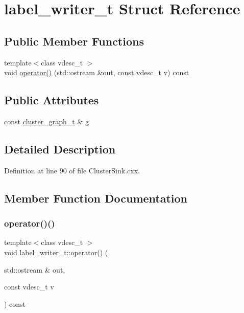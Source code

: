 \hypertarget{structlabel__writer__t}{}\section{label\+\_\+writer\+\_\+t Struct Reference}
\label{structlabel__writer__t}
\subsection*{Public Member Functions}
\begin{DoxyCompactItemize}
\item 
{\footnotesize template$<$class vdesc\+\_\+t $>$ }\\void \hyperlink{structlabel__writer__t_a79b36a668d266dccd58e0fccb69c147f}{operator()} (std\+::ostream \&out, const vdesc\+\_\+t v) const
\end{DoxyCompactItemize}
\subsection*{Public Attributes}
\begin{DoxyCompactItemize}
\item 
const \hyperlink{namespace_wire_cell_a6a9ecba14dfba50cdb081820a8bcacbe}{cluster\+\_\+graph\+\_\+t} \& \hyperlink{structlabel__writer__t_af3ff7cf87d5cdd0e60c0e1b47bc6717a}{g}
\end{DoxyCompactItemize}


\subsection{Detailed Description}


Definition at line 90 of file Cluster\+Sink.\+cxx.



\subsection{Member Function Documentation}
\mbox{\label{structlabel__writer__t_a79b36a668d266dccd58e0fccb69c147f}} 
\subsubsection{\texorpdfstring{operator()()}{operator()()}}
{\footnotesize\ttfamily template$<$class vdesc\+\_\+t $>$ \\
void label\+\_\+writer\+\_\+t\+::operator() (\begin{DoxyParamCaption}\item[{std\+::ostream \&}]{out,  }\item[{const vdesc\+\_\+t}]{v }\end{DoxyParamCaption}) const\hspace{0.3cm}{\ttfamily [inline]}}



